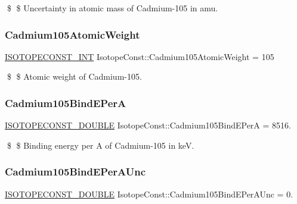 \$ \$ Uncertainty in atomic mass of Cadmium-\/105 in amu. \mbox{\label{group___isotope_const-_cadmium-_cd105_gab34d700c1c3bba517e62dfaedf0d5acf}} 
\subsubsection{\texorpdfstring{Cadmium105\+Atomic\+Weight}{Cadmium105AtomicWeight}}
{\footnotesize\ttfamily \mbox{\hyperlink{group___isotope_const-_macros_ga5f18360b3e99483a35c32d789e62621c}{I\+S\+O\+T\+O\+P\+E\+C\+O\+N\+S\+T\+\_\+\+I\+NT}} Isotope\+Const\+::\+Cadmium105\+Atomic\+Weight = 105}

\$ \$ Atomic weight of Cadmium-\/105. \mbox{\label{group___isotope_const-_cadmium-_cd105_ga427039059cbe150b3f432964291c9cfa}} 
\subsubsection{\texorpdfstring{Cadmium105\+Bind\+E\+PerA}{Cadmium105BindEPerA}}
{\footnotesize\ttfamily \mbox{\hyperlink{group___isotope_const-_macros_ga8f45a7272ce02c0b4c65c44636ed719a}{I\+S\+O\+T\+O\+P\+E\+C\+O\+N\+S\+T\+\_\+\+D\+O\+U\+B\+LE}} Isotope\+Const\+::\+Cadmium105\+Bind\+E\+PerA = 8516.}

\$ \$ Binding energy per A of Cadmium-\/105 in keV. \mbox{\label{group___isotope_const-_cadmium-_cd105_ga2fbfb16c8b57d48a6b29e56af45f1ef4}} 
\subsubsection{\texorpdfstring{Cadmium105\+Bind\+E\+Per\+A\+Unc}{Cadmium105BindEPerAUnc}}
{\footnotesize\ttfamily \mbox{\hyperlink{group___isotope_const-_macros_ga8f45a7272ce02c0b4c65c44636ed719a}{I\+S\+O\+T\+O\+P\+E\+C\+O\+N\+S\+T\+\_\+\+D\+O\+U\+B\+LE}} Isotope\+Const\+::\+Cadmium105\+Bind\+E\+Per\+A\+Unc = 0.}

